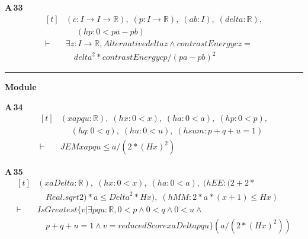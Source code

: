 \noindent\textbf{A\,33}\quad{}
{\footnotesize\[ \begin{aligned}[t]
&(\mathit{c} : \mathit{I} \to \mathit{I} \to \mathbb{R} ),\; (\mathit{p} : \mathit{I} \to \mathbb{R} ),\; (\mathit{a} \mathit{b} : \mathit{I}),\; (\mathit{delta} : \mathbb{R} ),\\
&\quad \; (\mathit{hp} : 0 < \mathit{p} \mathit{a}-\mathit{p} \mathit{b})\\
\vdash\;&\exists \mathit{z} : \mathit{I} \to \mathbb{R} , \mathit{Alternative} \mathit{delta} \mathit{z} \wedge \mathit{contrastEnergy} \mathit{c} \mathit{z} =\\
&\quad \mathit{delta}^{2}*\mathit{contrastEnergy} \mathit{c} \mathit{p}/(\mathit{p} \mathit{a}-\mathit{p} \mathit{b})^{2}
\end{aligned} \]}

\vspace{4pt}\noindent\rule{\columnwidth}{0.4pt}\par\vspace{2pt}
\noindent\textbf{Module }\par\vspace{3pt}

\noindent\textbf{A\,34}\quad{}
{\footnotesize\[ \begin{aligned}[t]
&(\mathit{x} \mathit{a} \mathit{p} \mathit{q} \mathit{u} : \mathbb{R} ),\; (\mathit{hx} : 0<\mathit{x}),\; (\mathit{ha} : 0<\mathit{a}),\; (\mathit{hp} : 0<\mathit{p}),\\
&\quad \; (\mathit{hq} : 0<\mathit{q}),\; (\mathit{hu} : 0<\mathit{u}),\; (\mathit{hsum} : \mathit{p}+\mathit{q}+\mathit{u}=1)\\
\vdash\;&\mathit{JEM} \mathit{x} \mathit{a} \mathit{p} \mathit{q} \mathit{u} \leq \mathit{a}/(2*(\mathit{H} \mathit{x})^{2})
\end{aligned} \]}

\noindent\textbf{A\,35}\quad{}
{\footnotesize\[ \begin{aligned}[t]
&(\mathit{x} \mathit{a} \mathit{Delta} : \mathbb{R} ),\; (\mathit{hx} : 0<\mathit{x}),\; (\mathit{ha} : 0<\mathit{a}),\; (\mathit{hEE} : (2+2*\\
&\quad \mathit{Real}.\mathit{sqrt} 2)*\mathit{a} \leq \mathit{Delta}^{2}*\mathit{H} \mathit{x}),\; (\mathit{hMM} : 2*\mathit{a}*(\mathit{x}+1) \leq \mathit{H} \mathit{x})\\
\vdash\;&\mathit{IsGreatest} \{ \mathit{v} | \exists \mathit{p} \mathit{q} \mathit{u} : \mathbb{R} , 0<\mathit{p} \wedge 0<\mathit{q} \wedge 0<\mathit{u} \wedge\\
&\quad \mathit{p}+\mathit{q}+\mathit{u}=1 \wedge \mathit{v}=\mathit{reducedScore} \mathit{x} \mathit{a} \mathit{Delta} \mathit{p} \mathit{q} \mathit{u}\} (\mathit{a}/(2*(\mathit{H} \mathit{x})^{2}))
\end{aligned} \]}

